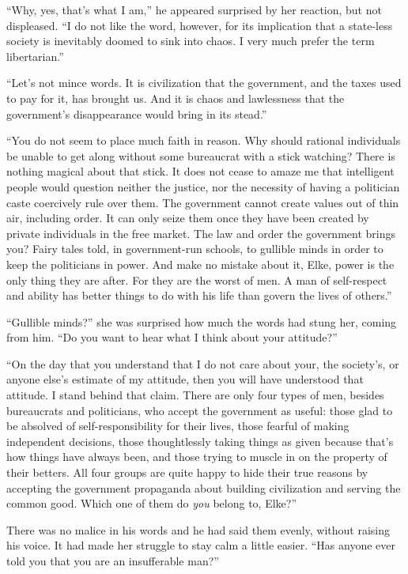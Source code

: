 ``Why, yes, that's what I am,'' he appeared surprised by her reaction, but not displeased. ``I do not like the word, however, for its implication that a state-less society is inevitably doomed to sink into chaos. I very much prefer the term libertarian.''

``Let's not mince words. It is civilization that the government, and the taxes used to pay for it, has brought us. And it is chaos and lawlessness that the government's disappearance would bring in its stead.''

``You do not seem to place much faith in reason. Why should rational individuals be unable to get along without some bureaucrat with a stick watching? There is nothing magical about that stick. It does not cease to amaze me that intelligent people would question neither the justice, nor the necessity of having a politician caste coercively rule over them. The government cannot create values out of thin air, including order. It can only seize them once they have been created by private individuals in the free market. The law and order the government brings you? Fairy tales told, in government-run schools, to gullible minds in order to keep the politicians in power. And make no mistake about it, Elke, power is the only thing they are after. For they are the worst of men. A man of self-respect and ability has better things to do with his life than govern the lives of others.''

``Gullible minds?'' she was surprised how much the words had stung her, coming from him. ``Do you want to hear what I think about your attitude?''

``On the day that you understand that I do not care about your, the society's, or anyone else's estimate of my attitude, then you will have understood that attitude. I stand behind that claim. There are only four types of men, besides bureaucrats and politicians, who accept the government as useful: those glad to be absolved of self-responsibility for their lives, those fearful of making independent decisions, those thoughtlessly taking things as given because that's how things have always been, and those trying to muscle in on the property of their betters. All four groups are quite happy to hide their true reasons by accepting the government propaganda about building civilization and serving the common good. Which one of them do \emph{you} belong to, Elke?''

There was no malice in his words and he had said them evenly, without raising his voice. It had made her struggle to stay calm a little easier. ``Has anyone ever told you that you are an insufferable man?''

